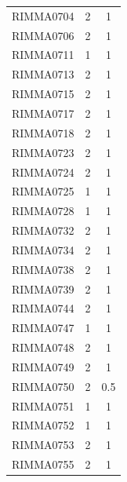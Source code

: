 \documentclass[12pt]{article}
\begin{document}
\begin{table}[htbp]
\begin{tabular}{ccc}
    RIMMA0704 & 2     & 1 \\
    RIMMA0706 & 2     & 1 \\
    RIMMA0711 & 1     & 1 \\
    RIMMA0713 & 2     & 1 \\
    RIMMA0715 & 2     & 1 \\
    RIMMA0717 & 2     & 1 \\
    RIMMA0718 & 2     & 1 \\
    RIMMA0723 & 2     & 1 \\
    RIMMA0724 & 2     & 1 \\
    RIMMA0725 & 1     & 1 \\
    RIMMA0728 & 1     & 1 \\
    RIMMA0732 & 2     & 1 \\
    RIMMA0734 & 2     & 1 \\
    RIMMA0738 & 2     & 1 \\
    RIMMA0739 & 2     & 1 \\
    RIMMA0744 & 2     & 1 \\
    RIMMA0747 & 1     & 1 \\
    RIMMA0748 & 2     & 1 \\
    RIMMA0749 & 2     & 1 \\
    RIMMA0750 & 2     & 0.5 \\
    RIMMA0751 & 1     & 1 \\
    RIMMA0752 & 1     & 1 \\
    RIMMA0753 & 2     & 1 \\
    RIMMA0755 & 2     & 1 \\
    \bottomrule
    \end{tabular}
  \label{TableS2Mays}
\end{table}
\end{document}
